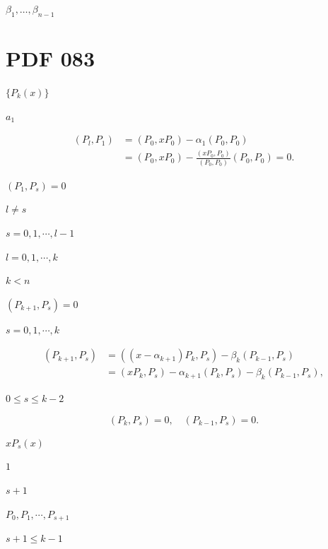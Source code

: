 \documentclass[UTF8,fontset=fandol,a4paper]{ctexart}
\begin{document}
\noindent $\beta_1,\ldots,\beta_{n-1}$\par

\section*{PDF 083}

\noindent $\{P_k(x)\}$\par

\noindent $a_1$\par

\[
\begin{aligned}
(P_l,P_1)&=(P_0,xP_0)-\alpha_1(P_0,P_0)\\
&=(P_0,xP_0)-\frac{(xP_0,P_0)}{(P_0,P_0)}(P_0,P_0)=0.
\end{aligned}
\]

\noindent $(P_1,P_s)=0$\par

\noindent $l\ne s$\par

\noindent $s=0,1,\cdots,l-1$\par

\noindent $l=0,1,\cdots,k$\par

\noindent $k<n$\par

\noindent $(P_{k+1},P_s)=0$\par

\noindent $s=0,1,\cdots,k$\par

\[
\begin{aligned}
(P_{k+1},P_s)&=((x-\alpha_{k+1})P_k,P_s)-\beta_k(P_{k-1},P_s)\\
&=(xP_k,P_s)-\alpha_{k+1}(P_k,P_s)-\beta_k(P_{k-1},P_s),
\end{aligned}\tag{3.6.12}
\]

\noindent $0\leqslant s\leqslant k-2$\par

\[
(P_k,P_s)=0,\quad(P_{k-1},P_s)=0.
\]

\noindent $xP_s(x)$\par

\noindent $1$\par

\noindent $s+1$\par

\noindent $P_0,P_1,\cdots,P_{s+1}$\par

\noindent $s+1\leqslant k-1$\par
\end{document}
